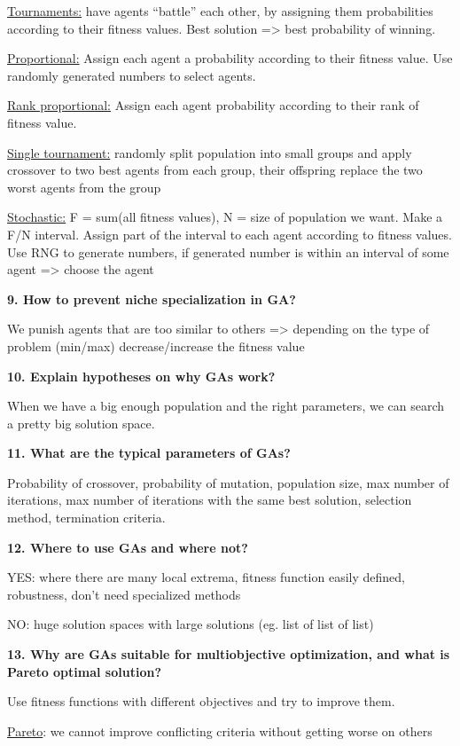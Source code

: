 \underline{Tournaments:} have agents ``battle'' each other, by assigning
them probabilities according to their fitness values. Best solution
=\textgreater{} best probability of winning.

\underline{Proportional:} Assign each agent a probability according to
their fitness value. Use randomly generated numbers to select agents.

\underline{Rank proportional:} Assign each agent probability according
to their rank of fitness value.

\underline{Single tournament:} randomly split population into small
groups and apply crossover to two best agents from each group, their
offspring replace the two worst agents from the group

\underline{Stochastic:} F = sum(all fitness values), N = size of
population we want. Make a F/N interval. Assign part of the interval to
each agent according to fitness values. Use RNG to generate numbers, if
generated number is within an interval of some agent =\textgreater{}
choose the agent

\textbf{9. How to prevent niche specialization in GA?}

We punish agents that are too similar to others =\textgreater{}
depending on the type of problem (min/max) decrease/increase the fitness
value

\textbf{10. Explain hypotheses on why GAs work?}

When we have a big enough population and the right parameters, we can
search a pretty big solution space.

\textbf{11. What are the typical parameters of GAs?}

Probability of crossover, probability of mutation, population size, max
number of iterations, max number of iterations with the same best
solution, selection method, termination criteria.

\textbf{12. Where to use GAs and where not?}

YES: where there are many local extrema, fitness function easily
defined, robustness, don't need specialized methods

NO: huge solution spaces with large solutions (eg. list of list of list)

\textbf{13. Why are GAs suitable for multiobjective optimization, and
what is Pareto optimal solution?}

Use fitness functions with different objectives and try to improve them.

\underline{Pareto}: we cannot improve conflicting criteria without
getting worse on others

